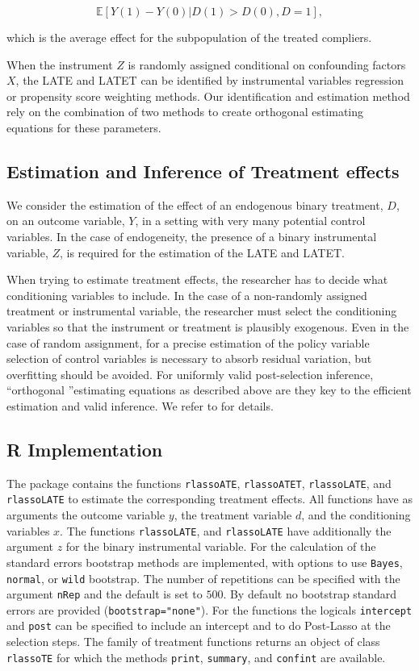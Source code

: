 \documentclass{amsart}\usepackage[]{graphicx}\usepackage[]{color}
\newcommand{\code}[1]{\texttt{#1}}
\begin{document}
\[  \mathbb{E}[Y(1)-Y(0)| D(1) > D(0), D=1], \]

which is the average effect for the subpopulation of the treated compliers. 

When the instrument $Z$ is randomly assigned conditional on confounding factors $X$, the LATE and LATET can be identified by instrumental variables regression or propensity score weighting methods.  Our identification and estimation method rely on the combination of two methods to create orthogonal estimating equations for these parameters.

\subsection{Estimation and Inference of Treatment effects}
We  consider the estimation of the effect of an endogenous binary treatment, $D$, on an outcome variable, $Y$, in a setting with very many potential control variables. In the case of endogeneity, the presence of a binary instrumental variable, $Z$, is required for the estimation of the LATE and LATET. 

When trying to estimate treatment effects, the researcher has to decide what conditioning variables to include. In the case of a non-randomly assigned treatment or instrumental variable, the researcher must select the conditioning variables so that the instrument or treatment is plausibly exogenous. Even in the case of random assignment, for a precise estimation of the policy variable selection of control variables is necessary to absorb residual variation, but overfitting should be avoided. For uniformly valid post-selection inference, \textquotedblleft orthogonal \textquotedblright estimating equations as described above are they key to the efficient estimation and valid inference. We refer to \citet{BCFH:Policy} for details.



\subsection*{R Implementation}
The package contains the functions \code{rlassoATE}, \code{rlassoATET}, \code{rlassoLATE}, and \code{rlassoLATE} to estimate the corresponding treatment effects. All functions have as arguments the outcome variable $y$, the treatment variable $d$, and the conditioning variables $x$. The functions \code{rlassoLATE}, and \code{rlassoLATE} have additionally the argument $z$ for the binary instrumental variable. For the calculation of the standard errors bootstrap methods are implemented, with options to use \code{Bayes}, \code{normal}, or \code{wild} bootstrap. The number of repetitions can be specified with the argument \code{nRep} and the default is set to $500$. By default no bootstrap standard errors are provided (\code{bootstrap="none"}). For the functions the logicals \code{intercept} and \code{post} can be specified to include an intercept and to do Post-Lasso at the selection steps. The family of treatment functions returns an object of class \code{rlassoTE} for which the methods \code{print}, \code{summary}, and \code{confint} are available.
\end{document}
